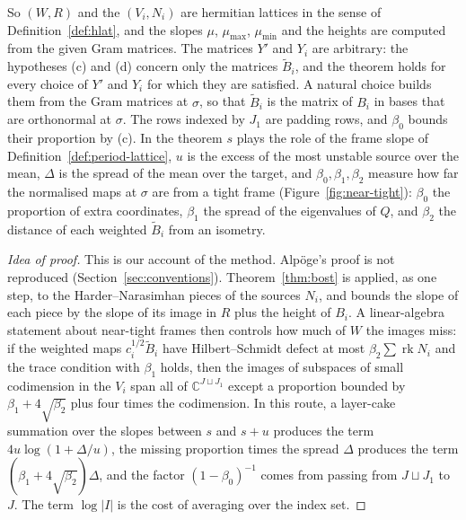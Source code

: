 \documentclass[11pt]{amsbook}
\theoremstyle{plain}
\theoremstyle{definition}
\theoremstyle{remark}
\numberwithin{equation}{section}
\numberwithin{figure}{chapter}
\numberwithin{table}{chapter}
\renewcommand{\C}{\mathbb{C}}
\newcommand{\rk}{\operatorname{rk}}
\begin{document}
\noindent So $(W,R)$ and the $(V_i,N_i)$ are hermitian lattices in
the sense of Definition~\ref{def:hlat}, and the slopes $\mu$,
$\mu_{\max}$, $\mu_{\min}$ and the heights are computed from the given
Gram matrices. The matrices $Y'$ and $Y_i$ are arbitrary: the
hypotheses (c) and (d) concern only the matrices $\widetilde B_i$, and
the theorem holds for every choice of $Y'$ and $Y_i$ for which they
are satisfied. A natural choice builds them from the Gram matrices at
$\sigma$, so that $\widetilde B_i$ is the matrix of $B_i$ in bases
that are orthonormal at $\sigma$. The rows indexed by $J_1$ are padding rows,
and $\beta_0$ bounds their
proportion by (c). In the
theorem $s$ plays the role of the frame slope of
Definition~\ref{def:period-lattice}, $u$ is the excess of the most
unstable source over the mean, $\Delta$ is the spread of the mean
over the target, and $\beta_0,\beta_1,\beta_2$ measure how far the
normalised maps at $\sigma$ are from a tight frame (Figure~\ref{fig:near-tight}): $\beta_0$ the
proportion of extra coordinates, $\beta_1$ the spread of the
eigenvalues of $Q$, and $\beta_2$ the distance of each weighted
$\widetilde B_i$ from an isometry.
\begin{figure}[tbp]
\centering

\end{figure}

\begin{proof}[Idea of proof]
This is our account of the method. Alp\"oge's proof is not
reproduced (Section~\ref{sec:conventions}).
Theorem~\ref{thm:bost} is applied, as one step, to the
Harder--Narasimhan pieces of the sources $N_i$, and bounds the slope of
each piece by the slope of its image in $R$ plus the height of $B_i$.
A linear-algebra statement about near-tight frames then controls how
much of $W$ the images miss: if the weighted maps $c_i^{1/2}\widetilde
B_i$ have Hilbert--Schmidt defect at most $\beta_2\sum\rk N_i$ and the
trace condition with $\beta_1$ holds, then the images of subspaces of
small codimension in the $V_i$ span all of $\C^{J\sqcup J_1}$ except a
proportion bounded by $\beta_1+4\sqrt{\beta_2}$ plus four times the
codimension. In this route, a layer-cake summation over the slopes between $s$
and $s+u$ produces the term $4u\log(1+\Delta/u)$, the missing
proportion times the spread $\Delta$ produces the term
$(\beta_1+4\sqrt{\beta_2})\Delta$, and the factor $(1-\beta_0)^{-1}$
comes from passing from $J\sqcup J_1$ to $J$. The term $\log|I|$ is
the cost of averaging over the index set.
\end{proof}
\end{document}
